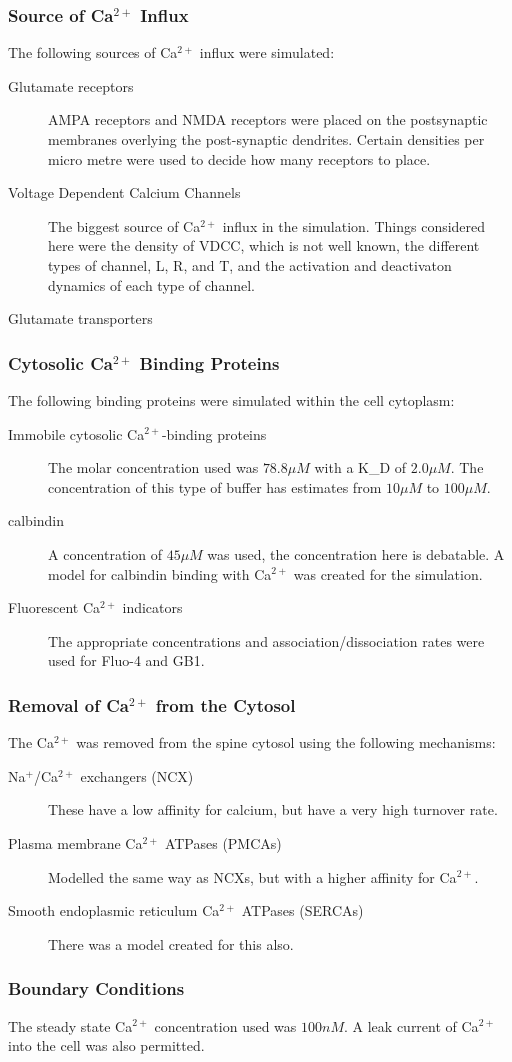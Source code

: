 \documentclass[a4paper,12pt]{article}
\theoremstyle{definition}
\begin{document}
\subsubsection*{Source of Ca$^{2+}$ Influx}
	The following sources of Ca$^{2+}$ influx were simulated:
	\begin{description}
		\item[Glutamate receptors] AMPA receptors and NMDA receptors were placed on the postsynaptic membranes overlying the post-synaptic dendrites. Certain densities per micro metre were used to decide how many receptors to place.
		\item[Voltage Dependent Calcium Channels] The biggest source of Ca$^{2+}$ influx in the simulation. Things considered here were the density of VDCC, which is not well known, the different types of channel, L, R, and T, and the activation and deactivaton dynamics of each type of channel. 
		\item[Glutamate transporters] 
	\end{description}	

\subsubsection*{Cytosolic Ca$^{2+}$ Binding Proteins}
	The following binding proteins were simulated within the cell cytoplasm:
	\begin{description}
		\item[Immobile cytosolic Ca$^{2+}$-binding proteins] The molar concentration used was $78.8 \mu M$ with a K\_D of $2.0 \mu M$. The concentration of this type of buffer has estimates from $10 \mu M$ to $100 \mu M$.
		\item[calbindin] A concentration of $45 \mu M$ was used, the concentration here is debatable. A model for calbindin binding with Ca$^{2+}$ was created for the simulation.
		\item[Fluorescent Ca$^{2+}$ indicators] The appropriate concentrations and association/dissociation rates were used for Fluo-4 and GB1.
	\end{description}
	
\subsubsection*{Removal of Ca$^{2+}$ from the Cytosol}
	The Ca$^{2+}$ was removed from the spine cytosol using the following mechanisms:
	\begin{description}
		\item[Na$^{+}$/Ca$^{2+}$ exchangers (NCX)] These have a low affinity for calcium, but have a very high turnover rate. 
		\item[Plasma membrane Ca$^{2+}$ ATPases (PMCAs)] Modelled the same way as NCXs, but with a higher affinity for Ca$^{2+}$.
		\item[Smooth endoplasmic reticulum Ca$^{2+}$ ATPases (SERCAs)] There was a model created for this also.
	\end{description}

\subsubsection*{Boundary Conditions}
	The steady state Ca$^{2+}$ concentration used was $100 nM$. A leak current of Ca$^{2+}$ into the cell was also permitted. 
\end{document}
